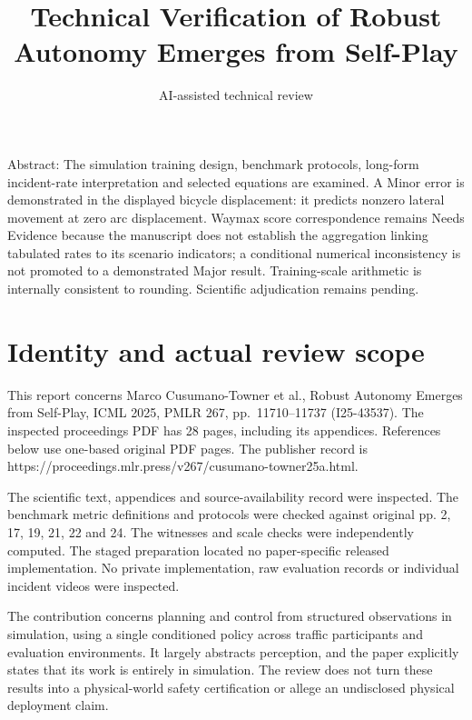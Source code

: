 \documentclass[10pt]{article}
\title{Technical Verification of Robust Autonomy Emerges from Self-Play}
\author{AI-assisted technical review}
\date{}
\begin{document}
\maketitle
Abstract: The simulation training design, benchmark protocols, long-form incident-rate interpretation and selected equations are examined. A Minor error is demonstrated in the displayed bicycle displacement: it predicts nonzero lateral movement at zero arc displacement. Waymax score correspondence remains Needs Evidence because the manuscript does not establish the aggregation linking tabulated rates to its scenario indicators; a conditional numerical inconsistency is not promoted to a demonstrated Major result. Training-scale arithmetic is internally consistent to rounding. Scientific adjudication remains pending.\par
\section*{Identity and actual review scope}
This report concerns Marco Cusumano-Towner et al., Robust Autonomy Emerges from Self-Play, ICML 2025, PMLR 267, pp. 11710–11737 (I25-43537). The inspected proceedings PDF has 28 pages, including its appendices. References below use one-based original PDF pages. The publisher record is https://proceedings.mlr.press/v267/cusumano-towner25a.html.\par
The scientific text, appendices and source-availability record were inspected. The benchmark metric definitions and protocols were checked against original pp. 2, 17, 19, 21, 22 and 24. The witnesses and scale checks were independently computed. The staged preparation located no paper-specific released implementation. No private implementation, raw evaluation records or individual incident videos were inspected.\par
The contribution concerns planning and control from structured observations in simulation, using a single conditioned policy across traffic participants and evaluation environments. It largely abstracts perception, and the paper explicitly states that its work is entirely in simulation. The review does not turn these results into a physical-world safety certification or allege an undisclosed physical deployment claim.\par
\end{document}
